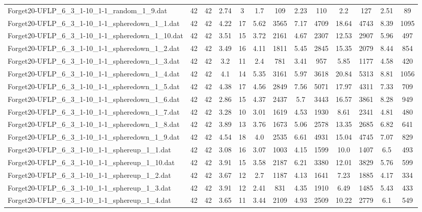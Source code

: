 \begin{table}[!ht]
{\begin{tabular}{lcccccccccccc}
Forget20-UFLP\_6\_3\_1-10\_1-1\_random\_1\_9.dat & 42 & 42 & 2.74 & 3 & 1.7 & 109 & 2.23 & 110 & 2.2 & 127 & 2.51 & 89 \\
Forget20-UFLP\_6\_3\_1-10\_1-1\_spheredown\_1\_1.dat & 42 & 42 & 4.22 & 17 & 5.62 & 3565 & 7.17 & 4709 & 18.64 & 4743 & 8.39 & 1095 \\
Forget20-UFLP\_6\_3\_1-10\_1-1\_spheredown\_1\_10.dat & 42 & 42 & 3.51 & 15 & 3.72 & 2161 & 4.67 & 2307 & 12.53 & 2907 & 5.96 & 497 \\
Forget20-UFLP\_6\_3\_1-10\_1-1\_spheredown\_1\_2.dat & 42 & 42 & 3.49 & 16 & 4.11 & 1811 & 5.45 & 2845 & 15.35 & 2079 & 8.44 & 854 \\
Forget20-UFLP\_6\_3\_1-10\_1-1\_spheredown\_1\_3.dat & 42 & 42 & 3.2 & 11 & 2.4 & 781 & 3.41 & 957 & 5.85 & 1177 & 4.58 & 420 \\
Forget20-UFLP\_6\_3\_1-10\_1-1\_spheredown\_1\_4.dat & 42 & 42 & 4.1 & 14 & 5.35 & 3161 & 5.97 & 3618 & 20.84 & 5313 & 8.81 & 1056 \\
Forget20-UFLP\_6\_3\_1-10\_1-1\_spheredown\_1\_5.dat & 42 & 42 & 4.38 & 17 & 4.56 & 2849 & 7.56 & 5071 & 17.97 & 4311 & 7.33 & 709 \\
Forget20-UFLP\_6\_3\_1-10\_1-1\_spheredown\_1\_6.dat & 42 & 42 & 2.86 & 15 & 4.37 & 2437 & 5.7 & 3443 & 16.57 & 3861 & 8.28 & 949 \\
Forget20-UFLP\_6\_3\_1-10\_1-1\_spheredown\_1\_7.dat & 42 & 42 & 3.28 & 10 & 3.01 & 1619 & 4.53 & 1930 & 8.61 & 2341 & 4.81 & 480 \\
Forget20-UFLP\_6\_3\_1-10\_1-1\_spheredown\_1\_8.dat & 42 & 42 & 3.89 & 13 & 3.76 & 1673 & 5.06 & 2578 & 13.35 & 2685 & 6.82 & 641 \\
Forget20-UFLP\_6\_3\_1-10\_1-1\_spheredown\_1\_9.dat & 42 & 42 & 4.54 & 18 & 4.0 & 2535 & 6.61 & 4931 & 15.04 & 4745 & 7.07 & 829 \\
Forget20-UFLP\_6\_3\_1-10\_1-1\_sphereup\_1\_1.dat & 42 & 42 & 3.08 & 16 & 3.07 & 1003 & 4.15 & 1599 & 10.0 & 1407 & 6.5 & 493 \\
Forget20-UFLP\_6\_3\_1-10\_1-1\_sphereup\_1\_10.dat & 42 & 42 & 3.91 & 15 & 3.58 & 2187 & 6.21 & 3380 & 12.01 & 3829 & 5.76 & 599 \\
Forget20-UFLP\_6\_3\_1-10\_1-1\_sphereup\_1\_2.dat & 42 & 42 & 3.67 & 12 & 2.7 & 1187 & 4.13 & 1641 & 7.23 & 1885 & 4.17 & 334 \\
Forget20-UFLP\_6\_3\_1-10\_1-1\_sphereup\_1\_3.dat & 42 & 42 & 3.91 & 12 & 2.41 & 831 & 4.35 & 1910 & 6.49 & 1485 & 5.43 & 433 \\
Forget20-UFLP\_6\_3\_1-10\_1-1\_sphereup\_1\_4.dat & 42 & 42 & 3.65 & 11 & 3.44 & 2109 & 4.93 & 2509 & 10.22 & 2779 & 6.1 & 549 \\

\end{tabular}}
\end{table}
